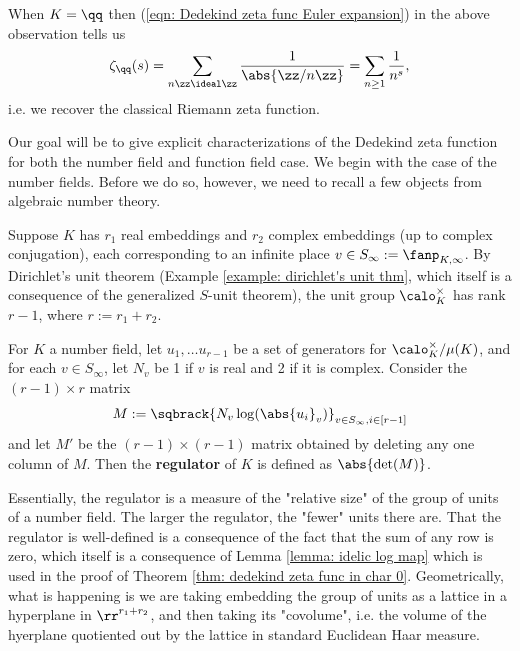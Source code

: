 \documentclass[11pt, x11names, openany]{book}
\begin{document}
\begin{example}
    \label{example: riemann zeta function}
When $K = \qq$ then (\ref{eqn: Dedekind zeta func Euler expansion}) in the above observation tells us 
\begin{equation*}
    \zeta_\qq(s) = \sum_{n\zz \ideal \zz} \frac{1}{\abs{\zz / n \zz}} = \sum_{n \geq 1} \frac{1}{n^s},
\end{equation*}
i.e. we recover the classical Riemann zeta function.
\end{example}




Our goal will be to give explicit characterizations of the Dedekind zeta function for both the number field and function field case. We begin with the case of the number fields. Before we do so, however, we need to recall a few objects from algebraic number theory.

Suppose $K$ has $r_1$ real embeddings and $r_2$ complex embeddings (up to complex conjugation), each corresponding to an infinite place $v \in S_\infty := \fanp_{K, \infty}$. By Dirichlet's unit theorem (Example \ref{example: dirichlet's unit thm}, which itself is a consequence of the generalized $S$-unit theorem), the unit group $\calo_K^\times$ has rank $r - 1$, where $r := r_1 + r_2$.

\begin{defn}
\label{def: regulator}
For $K$ a number field, let $u_1, \ldots u_{r-1}$ be a set of generators for $\calo_{K}^\times/\mu(K)$, and for each $v \in S_\infty$, let $N_v$ be 1 if $v$ is real and 2 if it is complex. Consider the $(r-1) \times r$ matrix 
\begin{equation*}
    M := \sqbrack{N_v \log(\abs{u_i}_v)}_{v \in S_\infty, i \in [r-1]}
\end{equation*}
and let $M'$ be the $(r-1) \times (r-1)$ matrix obtained by deleting any one column of $M$. Then the \textbf{regulator} of $K$ is defined as $\abs{\det(M)}$.
\end{defn}

Essentially, the regulator is a measure of the "relative size" of the group of units of a number field. The larger the regulator, the "fewer" units there are. That the regulator is well-defined is a consequence of the fact that the sum of any row is zero, which itself is a consequence of Lemma \ref{lemma: idelic log map} which is used in the proof of Theorem \ref{thm: dedekind zeta func in char 0}. Geometrically, what is happening is we are taking embedding the group of units as a lattice in a hyperplane in $\rr^{r_1 + r_2}$, and then taking its "covolume", i.e. the volume of the hyerplane quotiented out by the lattice in standard Euclidean Haar measure.
\end{document}
